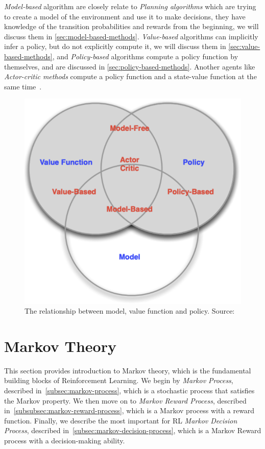 \documentclass[../xlapes02]{subfiles}
\begin{document}
    \emph{Model-based} algorithm are closely relate to \emph{Planning algorithms} which are trying to create a model of the environment and use it to make decisions, they have knowledge of the transition probabilities and rewards from the beginning, we will discuss them in \cref{sec:model-based-methods}. \emph{Value-based} algorithms can implicitly infer a policy, but do not explicitly compute it, we will discuss them in \cref{sec:value-based-methods}, and \emph{Policy-based} algorithms compute a policy function by themselves, and are discussed in \cref{sec:policy-based-methods}. Another agents like \emph{Actor-critic methods} compute a policy function and a state-value function at the same time~\cite{rl-course-david-silver, sutton2018reinforcement}.

    \begin{figure}[h]
        \includegraphics[width=0.5\linewidth]{image/model-value-policy}
        \centering
        \caption{The relationship between model, value function and policy. Source:~\cite{FITMT25127}}
        \label{fig:model-value-policy-introduction}
    \end{figure}


    \section{Markov Theory}\label{sec:markov-models-for-rl}
    This section provides introduction to Markov theory, which is the fundamental building blocks of Reinforcement Learning. We begin by \emph{Markov Process}, described in~\cref{subsec:markov-process}, which is a stochastic process that satisfies the Markov property. We then move on to \emph{Markov Reward Process}, described in~\cref{subsubsec:markov-reward-process}, which is a Markov process with a reward function. Finally, we describe the most important for RL \emph{Markov Decision Process}, described in~\cref{subsec:markov-decision-process}, which is a Markov Reward process with a decision-making ability.
\end{document}
